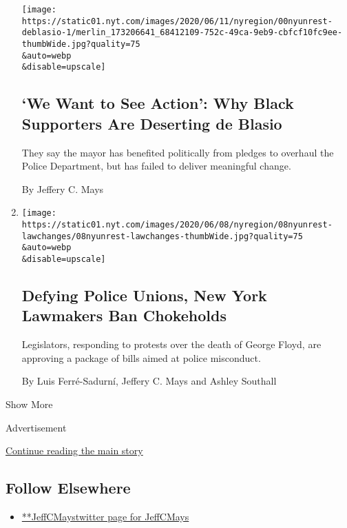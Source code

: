 \begin{enumerate}
  \texttt{[image: https://static01.nyt.com/images/2020/06/11/nyregion/00nyunrest-deblasio-1/merlin\_173206641\_68412109-752c-49ca-9eb9-cbfcf10fc9ee-thumbWide.jpg?quality=75\\\&auto=webp\\\&disable=upscale]}

  \hypertarget{we-want-to-see-action-why-black-supporters-are-deserting-de-blasio}{%
  \subsection{`We Want to See Action': Why Black Supporters Are
  Deserting de
  Blasio}\label{we-want-to-see-action-why-black-supporters-are-deserting-de-blasio}}

  They say the mayor has benefited politically from pledges to overhaul
  the Police Department, but has failed to deliver meaningful change.

  By Jeffery C. Mays
\item
  \href{/2020/06/08/nyregion/floyd-protests-police-reform.html}{}

  \texttt{[image: https://static01.nyt.com/images/2020/06/08/nyregion/08nyunrest-lawchanges/08nyunrest-lawchanges-thumbWide.jpg?quality=75\\\&auto=webp\\\&disable=upscale]}

  \hypertarget{defying-police-unions-new-york-lawmakers-ban-chokeholds}{%
  \subsection{Defying Police Unions, New York Lawmakers Ban
  Chokeholds}\label{defying-police-unions-new-york-lawmakers-ban-chokeholds}}

  Legislators, responding to protests over the death of George Floyd,
  are approving a package of bills aimed at police misconduct.

  By Luis Ferré-Sadurní, Jeffery C. Mays and Ashley Southall
\end{enumerate}

Show More

Advertisement

\protect\hyperlink{after-mid2}{Continue reading the main story}

\hypertarget{follow-elsewhere}{%
\subsection{Follow Elsewhere}\label{follow-elsewhere}}

\begin{itemize}
\tightlist
\item
  \href{https://twitter.com/JeffCMays}{**JeffCMaystwitter page for
  JeffCMays}
\end{itemize}

